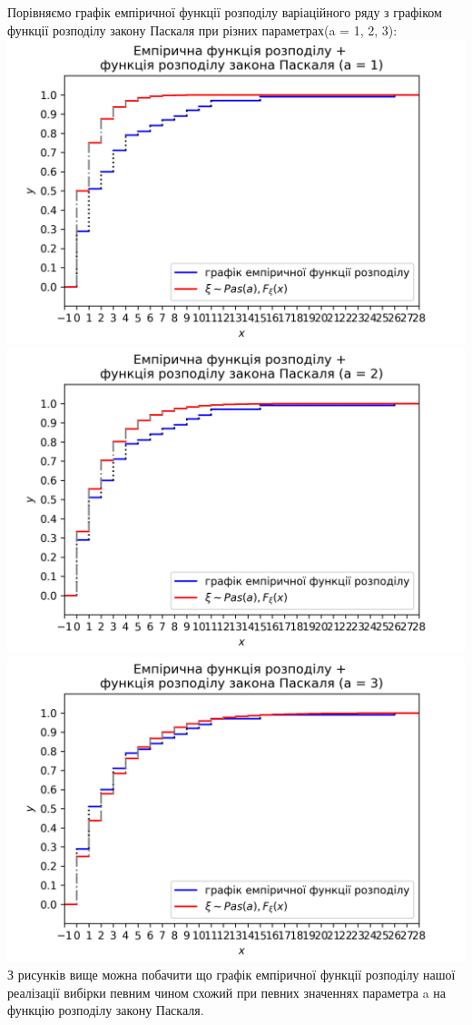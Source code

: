 \documentclass{article}
\begin{document}
\newline
Порівняємо графік емпіричної функції розподілу варіаційного ряду 
з графіком функції розподілу закону Паскаля при 
різних параметрах(a = 1, 2, 3):
\newline
\includegraphics[scale = 0.8]{func+geom4}
\newline
\includegraphics[scale = 0.8]{func+geom3}
\newline
\includegraphics[scale = 0.8]{func+geom2}
\newline
З рисунків вище можна побачити що графік емпіричної функції
розподілу нашої реалізації вибірки певним чином схожий при 
певних значеннях
параметра a на функцію розподілу закону Паскаля.
\end{document}

